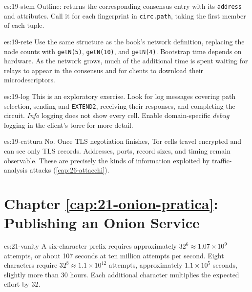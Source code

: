 \begin{soluzione}{es:19-stem}
Outline:  returns the corresponding consensus entry with its \texttt{address} and  attributes. Call it for each fingerprint in \texttt{circ.path}, taking the first member of each tuple.
\end{soluzione}

\begin{soluzione}{es:19-rete}
Use the same structure as the book's network definition, replacing the node counts with \texttt{getN(5)}, \texttt{getN(10)}, and \texttt{getN(4)}. Bootstrap time depends on hardware. As the network grows, much of the additional time is spent waiting for relays to appear in the consensus and for clients to download their microdescriptors.
\end{soluzione}

\begin{soluzione}{es:19-log}
This is an exploratory exercise. Look for log messages covering path selection, sending  and \texttt{EXTEND2}, receiving their responses, and completing the circuit. \emph{Info} logging does not show every cell. Enable domain-specific \emph{debug} logging in the client's torrc for more detail.
\end{soluzione}

\begin{soluzione}{es:19-cattura}
No. Once TLS negotiation finishes, Tor cells travel encrypted and  can see only TLS records. Addresses, ports, record sizes, and timing remain observable. These are precisely the kinds of information exploited by traffic-analysis attacks (\cref{cap:26-attacchi}).
\end{soluzione}

\section*{Chapter \ref{cap:21-onion-pratica}: Publishing an Onion Service}

\begin{soluzione}{es:21-vanity}
A six-character prefix requires approximately $32^6 \approx 1.07 \times 10^9$ attempts, or about 107 seconds at ten million attempts per second. Eight characters require $32^8 \approx 1.1 \times 10^{12}$ attempts, approximately $1.1 \times 10^5$ seconds, slightly more than 30 hours. Each additional character multiplies the expected effort by 32.
\end{soluzione}

